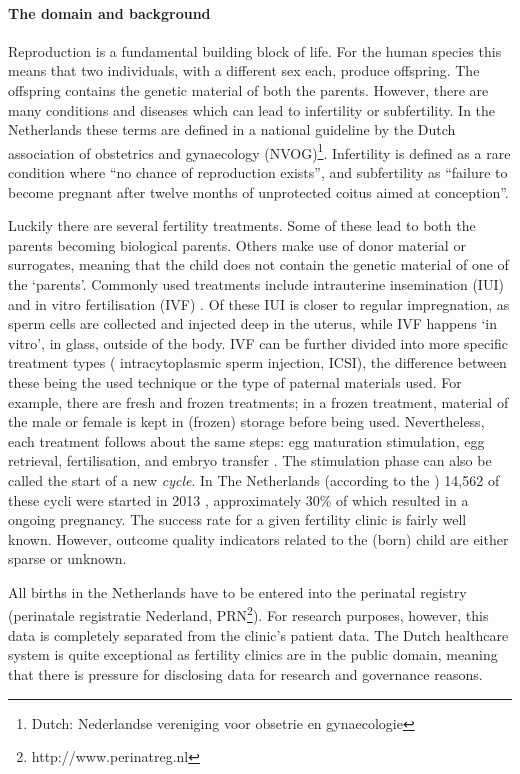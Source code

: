 \paragraph{The domain and background}
Reproduction is a fundamental building block of life.
For the human species this means that two individuals, with a different sex each, produce offspring.
The offspring contains the genetic material of both the parents.
However, there are many conditions and diseases which can lead to infertility or subfertility.
In the Netherlands these terms are defined in a national guideline by the Dutch association of obstetrics and gynaecology (NVOG)\footnote{Dutch: Nederlandse vereniging voor obsetrie en gynaecologie}\cite{subfertilityGuideline}.
Infertility is defined as a rare condition where ``no chance of reproduction exists'', 
and subfertility as ``failure to become pregnant after twelve months of unprotected coitus aimed at conception''.

Luckily there are several fertility treatments.
Some of these lead to both the parents becoming biological parents. 
Others make use of donor material or surrogates, meaning that the child does not contain the genetic material of one of the `parents'.
Commonly used treatments include intrauterine insemination (IUI) and in vitro fertilisation (IVF) \cite{treatmentExplanation}.
Of these IUI is closer to regular impregnation, as sperm cells are collected and injected deep in the uterus, while IVF happens `in vitro', \ie{} in glass, outside of the body.
IVF can be further divided into more specific treatment types (\eg{} intracytoplasmic sperm injection, ICSI), 
the difference between these being the used technique or the type of paternal  materials used.
For example, there are fresh and frozen treatments; in a frozen treatment, material of the male or female is kept in (frozen) storage before being used.
Nevertheless, each treatment follows about the same steps: egg maturation stimulation, egg retrieval, fertilisation, and embryo transfer \cite{treatmentExplanation}.
The stimulation phase can also be called the start of a new \emph{cycle}. In The Netherlands (according to the ) 14,562 of these cycli were started in 2013 \cite{ivfReportNVOG2013}, approximately 30\% of which resulted in a ongoing pregnancy.
The success rate for a given fertility clinic is fairly well known.
However, outcome quality indicators related to the (born) child are either sparse or unknown.

All births in the Netherlands have to be entered into the perinatal registry (perinatale registratie Nederland, PRN\footnote{http://www.perinatreg.nl}).
For research purposes, however, this data is completely separated from the clinic's patient data.
The Dutch healthcare system is quite exceptional as fertility clinics are in the public domain, 
meaning that there is pressure for disclosing  data for research and governance reasons.

